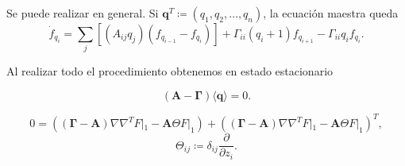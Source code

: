 \documentclass[xcolor=dvipsnames]{beamer}
\begin{document}
\begin{frame}
Se puede realizar en general. Si $\mathbf{q}^T \coloneqq (q_1,q_2,\dots,q_n)$,
la ecuaci\'on maestra queda
\begin{equation*}
\dot{f}_{q_i} = \sum_j \left[\left(A_{ij}q_j\right) \left(f_{q_{i-1}} - f_{q_i}\right)\right] + \Gamma_{ii}(q_i+1)f_{q_{i+1}} -\Gamma_{ii}q_if_{q_i}.
\end{equation*}

Al realizar todo el procedimiento obtenemos en estado estacionario

$$\left(\mathbf{A} - \mathbf{\Gamma}\right)\langle \mathbf{q} \rangle = 0.$$

$$0 = \left( \left( \mathbf{\Gamma} - \mathbf{A}\right) \nabla\nabla^TF|_1 - \mathbf{A}\Theta F|_1 \right) +  \left( \left( \mathbf{\Gamma} - \mathbf{A}\right) \nabla\nabla^TF|_1 - \mathbf{A}\Theta F|_1\right)^T,$$ 
$$\Theta_{ij} \coloneqq \delta_{ij}\frac{\partial}{\partial z_i}.$$
\end{frame}
\end{document}

